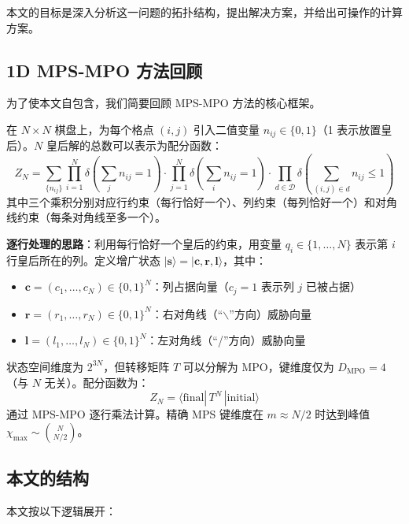 \documentclass[12pt,a4paper]{ctexart}
\begin{document}
本文的目标是深入分析这一问题的拓扑结构，提出解决方案，并给出可操作的计算方案。

\subsection{1D MPS-MPO 方法回顾}

为了使本文自包含，我们简要回顾 MPS-MPO 方法的核心框架。

在 $N \times N$ 棋盘上，为每个格点 $(i,j)$ 引入二值变量 $n_{ij} \in \{0, 1\}$（1 表示放置皇后）。$N$ 皇后解的总数可以表示为配分函数：
\begin{equation}
Z_N = \sum_{\{n_{ij}\}} \prod_{i=1}^{N} \delta\!\left(\sum_j n_{ij} = 1\right) \cdot \prod_{j=1}^{N} \delta\!\left(\sum_i n_{ij} = 1\right) \cdot \prod_{d \in \mathcal{D}} \delta\!\left(\sum_{(i,j)\in d} n_{ij} \leq 1\right)
\end{equation}
其中三个乘积分别对应行约束（每行恰好一个）、列约束（每列恰好一个）和对角线约束（每条对角线至多一个）。

\textbf{逐行处理的思路}：利用每行恰好一个皇后的约束，用变量 $q_i \in \{1, \ldots, N\}$ 表示第 $i$ 行皇后所在的列。定义增广状态 $|\mathbf{s}\rangle = |\mathbf{c}, \mathbf{r}, \mathbf{l}\rangle$，其中：
\begin{itemize}
\item $\mathbf{c} = (c_1, \ldots, c_N) \in \{0,1\}^N$：列占据向量（$c_j = 1$ 表示列 $j$ 已被占据）
\item $\mathbf{r} = (r_1, \ldots, r_N) \in \{0,1\}^N$：右对角线（``$\backslash$''方向）威胁向量
\item $\mathbf{l} = (l_1, \ldots, l_N) \in \{0,1\}^N$：左对角线（``/''方向）威胁向量
\end{itemize}

状态空间维度为 $2^{3N}$，但转移矩阵 $T$ 可以分解为 MPO，键维度仅为 $D_{\text{MPO}} = 4$（与 $N$ 无关）。配分函数为：
\begin{equation}
\boxed{Z_N = \langle \text{final} | \, T^N \, | \text{initial} \rangle}
\end{equation}
通过 MPS-MPO 逐行乘法计算。精确 MPS 键维度在 $m \approx N/2$ 时达到峰值 $\chi_{\max} \sim \binom{N}{N/2}$。

\subsection{本文的结构}

本文按以下逻辑展开：
\end{document}
